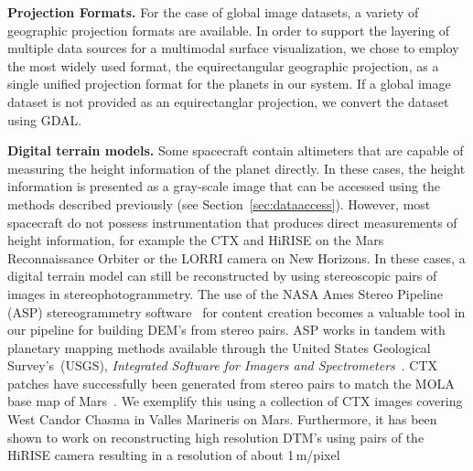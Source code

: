 \documentclass[journal]{vgtc}                %
\newcommand{\kallecomment}[1]{\textbf{[-Kalle-~}
    \textcolor{orange}{#1}
    \textbf{~]}}
\begin{document}

\noindent \textbf{Projection Formats. } For the case of global image datasets, a variety of geographic projection formats are available.
In order to support the layering of multiple data sources for a multimodal surface visualization, we chose to employ the most widely used format, the equirectangular geographic projection, as a single unified projection format for the planets in our system.
If a global image dataset is not provided as an equirectanglar projection, we convert the dataset using GDAL.

\noindent \textbf{Digital terrain models. } Some spacecraft contain altimeters that are capable of measuring the height information of the planet directly.
In these cases, the height information is presented as a gray-scale image that can be accessed using the methods described previously (see Section~\ref{sec:dataaccess}).
However, most spacecraft do not possess instrumentation that produces direct measurements of height information, for example the CTX and HiRISE on the Mars Reconnaissance Orbiter or the LORRI camera on New Horizons.
In these cases, a digital terrain model can still be reconstructed by using stereoscopic pairs of images in stereophotogrammetry.
The use of the NASA Ames Stereo Pipeline (ASP) stereogrammetry software~\cite{moratto2010ames} for content creation becomes a valuable tool in our pipeline for building DEM's from stereo pairs.
ASP works in tandem with planetary mapping methods available through the United States Geological Survey's~(USGS), \emph{Integrated Software for Imagers and Spectrometers}~\cite{gaddis1997overview}.
CTX patches have successfully been generated from stereo pairs to match the MOLA base map of Mars~\cite{broxton2008ames, mayer2016integrated}. We exemplify this using a collection of CTX images covering West Candor Chasma in Valles Marineris on Mars.
Furthermore, it has been shown to work on reconstructing high resolution DTM's using pairs of the HiRISE camera resulting in a resolution of about 1\,m/pixel~\cite{li2011rigorous}
\end{document}
